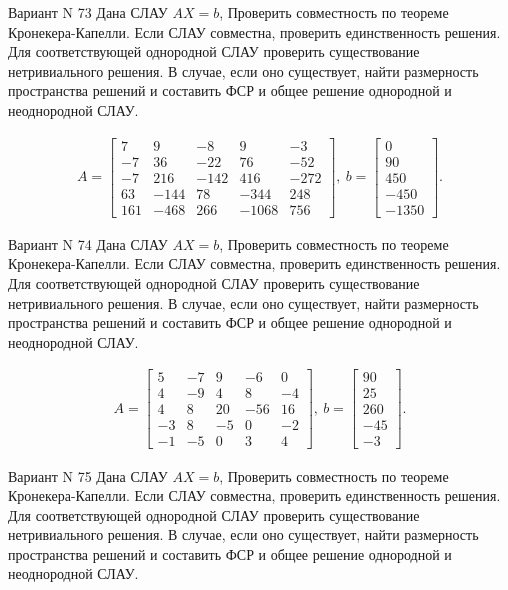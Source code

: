 \documentclass[11pt]{report}
\begin{document}
Вариант N 73
Дана СЛАУ $AX = b$,
Проверить совместность по теореме Кронекера-Капелли. Если СЛАУ совместна, проверить единственность решения.
Для соответствующей однородной СЛАУ проверить существование нетривиального решения. В случае, если оно существует,
найти размерность пространства решений и составить ФСР и общее решение однородной  и неоднородной СЛАУ.


\begin{align*}
 A = \left[\begin{matrix}7 & 9 & -8 & 9 & -3\\-7 & 36 & -22 & 76 & -52\\-7 & 216 & -142 & 416 & -272\\63 & -144 & 78 & -344 & 248\\161 & -468 & 266 & -1068 & 756\end{matrix}\right],
\ b = \left[\begin{matrix}0\\90\\450\\-450\\-1350\end{matrix}\right]. 
 \end{align*}

Вариант N 74
Дана СЛАУ $AX = b$,
Проверить совместность по теореме Кронекера-Капелли. Если СЛАУ совместна, проверить единственность решения.
Для соответствующей однородной СЛАУ проверить существование нетривиального решения. В случае, если оно существует,
найти размерность пространства решений и составить ФСР и общее решение однородной  и неоднородной СЛАУ.


\begin{align*}
 A = \left[\begin{matrix}5 & -7 & 9 & -6 & 0\\4 & -9 & 4 & 8 & -4\\4 & 8 & 20 & -56 & 16\\-3 & 8 & -5 & 0 & -2\\-1 & -5 & 0 & 3 & 4\end{matrix}\right],
\ b = \left[\begin{matrix}90\\25\\260\\-45\\-3\end{matrix}\right]. 
 \end{align*}

Вариант N 75
Дана СЛАУ $AX = b$,
Проверить совместность по теореме Кронекера-Капелли. Если СЛАУ совместна, проверить единственность решения.
Для соответствующей однородной СЛАУ проверить существование нетривиального решения. В случае, если оно существует,
найти размерность пространства решений и составить ФСР и общее решение однородной  и неоднородной СЛАУ.
\end{document}
